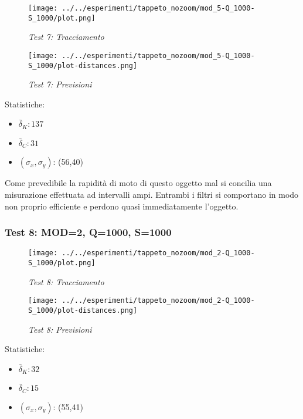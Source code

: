 \begin{figure}[hb]
\centering
\texttt{[image: ../../esperimenti/tappeto\_nozoom/mod\_5-Q\_1000-S\_1000/plot.png]}
\caption{\textit{Test 7: Tracciamento}}
\end{figure}

\begin{figure}[hb]
\centering
\texttt{[image: ../../esperimenti/tappeto\_nozoom/mod\_5-Q\_1000-S\_1000/plot-distances.png]}
\caption{\textit{Test 7: Previsioni}}
\end{figure}

Statistiche:
\begin{itemize}
\item \begin{math} \bar \delta_K: 137 \end{math}
\item \begin{math} \bar \delta_C: 31\end{math}
\item \begin{math}(\sigma_x,\sigma_y)\end{math}: (56,40)
\end{itemize} 

Come prevedibile la rapidità di moto di questo oggetto mal si concilia una misurazione effettuata ad intervalli ampi. Entrambi i filtri si comportano in modo non proprio efficiente e perdono quasi immediatamente l'oggetto.

\newpage
\subsubsection{Test 8: MOD=2, Q=1000, S=1000}

\begin{figure}[hb]
\centering
\texttt{[image: ../../esperimenti/tappeto\_nozoom/mod\_2-Q\_1000-S\_1000/plot.png]}
\caption{\textit{Test 8: Tracciamento}}
\end{figure}

\begin{figure}[hb]
\centering
\texttt{[image: ../../esperimenti/tappeto\_nozoom/mod\_2-Q\_1000-S\_1000/plot-distances.png]}
\caption{\textit{Test 8: Previsioni}}
\end{figure}

Statistiche:
\begin{itemize}
\item \begin{math} \bar \delta_K: 32 \end{math}
\item \begin{math} \bar \delta_C: 15 \end{math}
\item \begin{math}(\sigma_x,\sigma_y)\end{math}: (55,41)
\end{itemize}


